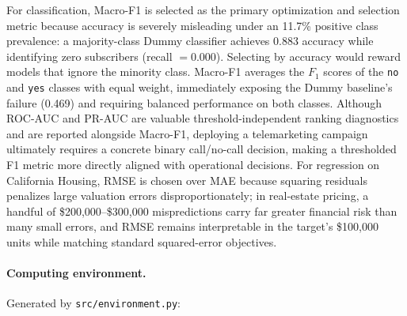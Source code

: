 For classification, Macro-F1 is selected as the primary optimization and selection metric because accuracy is severely misleading under an 11.7\% positive class prevalence: a majority-class Dummy classifier achieves 0.883 accuracy while identifying zero subscribers (recall $= 0.000$). Selecting by accuracy would reward models that ignore the minority class. Macro-F1 averages the $F_1$ scores of the \texttt{no} and \texttt{yes} classes with equal weight, immediately exposing the Dummy baseline's failure (0.469) and requiring balanced performance on both classes. Although ROC-AUC and PR-AUC are valuable threshold-independent ranking diagnostics and are reported alongside Macro-F1, deploying a telemarketing campaign ultimately requires a concrete binary call/no-call decision, making a thresholded F1 metric more directly aligned with operational decisions. For regression on California Housing, RMSE is chosen over MAE because squaring residuals penalizes large valuation errors disproportionately; in real-estate pricing, a handful of \$200,000--\$300,000 mispredictions carry far greater financial risk than many small errors, and RMSE remains interpretable in the target's \$100,000 units while matching standard squared-error objectives.

\paragraph{Computing environment.} Generated by \texttt{src/environment.py}:
